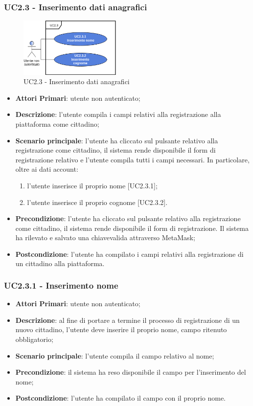 \subsubsection{UC2.3 - Inserimento dati anagrafici}
\begin{figure}[h]
	\includegraphics[width=5cm]{res/images/UC2-3Registrazione-cliente.png}
	\centering
	\caption{UC2.3 - Inserimento dati anagrafici}
\end{figure}
\begin{itemize}
	\item \textbf{Attori Primari}: utente non autenticato;
	\item \textbf{Descrizione}: l'utente compila i campi relativi alla registrazione alla piattaforma come cittadino;
	\item \textbf{Scenario principale}: l'utente ha cliccato sul pulsante relativo alla registrazione come cittadino, il sistema rende disponibile il form di registrazione relativo e l'utente compila tutti i campi necessari. In particolare, oltre ai dati account:
	\begin{enumerate}[label=\alph*.]
		\item l'utente inserisce il proprio nome [UC2.3.1];
		\item l'utente inserisce il proprio cognome [UC2.3.2].
	\end{enumerate}
	\item \textbf{Precondizione}: l'utente ha cliccato sul pulsante relativo alla registrazione come cittadino, il sistema rende disponibile il form di registrazione. Il sistema ha rilevato e salvato una chiave\glosp valida attraverso MetaMask\glo;
	\item \textbf{Postcondizione}: l'utente ha compilato i campi relativi alla registrazione di un cittadino alla piattaforma.
\end{itemize}
\subsubsection{UC2.3.1 - Inserimento nome}
\begin{itemize}
	\item \textbf{Attori Primari}: utente non autenticato;
	\item \textbf{Descrizione}: al fine di portare a termine il processo di registrazione di un nuovo cittadino, l'utente deve inserire il proprio nome, campo ritenuto obbligatorio;
	\item \textbf{Scenario principale}: l'utente compila il campo relativo al nome;
	\item \textbf{Precondizione}: il sistema ha reso disponibile il campo per l'inserimento del nome;
	\item \textbf{Postcondizione}: l'utente ha compilato il campo con il proprio nome.
\end{itemize}
